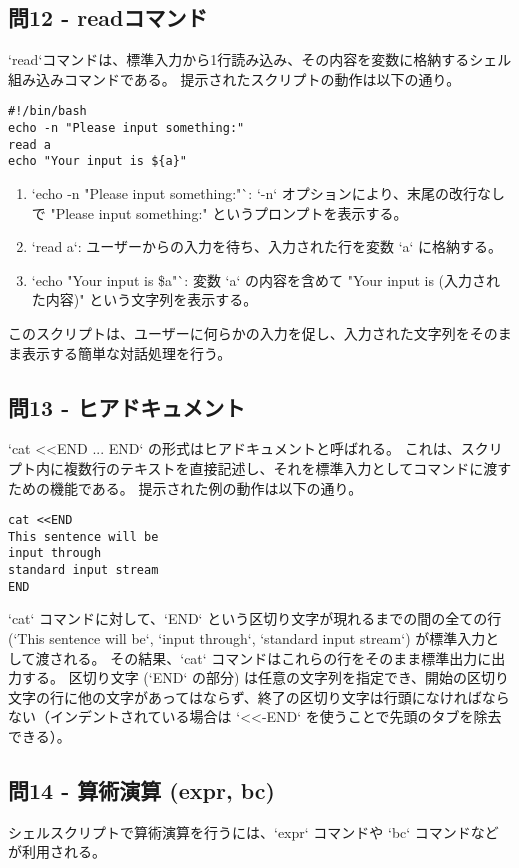 \documentclass[a4paper,11pt]{jsarticle}
\begin{document}
\subsection*{問12 - readコマンド}
`read`コマンドは、標準入力から1行読み込み、その内容を変数に格納するシェル組み込みコマンドである。
提示されたスクリプトの動作は以下の通り。
\begin{lstlisting}[caption=問12のスクリプト例]
#!/bin/bash
echo -n "Please input something:"
read a
echo "Your input is ${a}"
\end{lstlisting}
\begin{enumerate}
    \item `echo -n "Please input something:"`: `-n` オプションにより、末尾の改行なしで "Please input something:" というプロンプトを表示する。
    \item `read a`: ユーザーからの入力を待ち、入力された行を変数 `a` に格納する。
    \item `echo "Your input is \${a}"`: 変数 `a` の内容を含めて "Your input is (入力された内容)" という文字列を表示する。
\end{enumerate}
このスクリプトは、ユーザーに何らかの入力を促し、入力された文字列をそのまま表示する簡単な対話処理を行う。

\subsection*{問13 - ヒアドキュメント}
`cat <<END ... END` の形式はヒアドキュメントと呼ばれる。
これは、スクリプト内に複数行のテキストを直接記述し、それを標準入力としてコマンドに渡すための機能である。
提示された例の動作は以下の通り。
\begin{lstlisting}[caption=問13のスクリプト例]
cat <<END
This sentence will be
input through
standard input stream
END
\end{lstlisting}
`cat` コマンドに対して、`END` という区切り文字が現れるまでの間の全ての行 (`This sentence will be`, `input through`, `standard input stream`) が標準入力として渡される。
その結果、`cat` コマンドはこれらの行をそのまま標準出力に出力する。
区切り文字 (`END` の部分) は任意の文字列を指定でき、開始の区切り文字の行に他の文字があってはならず、終了の区切り文字は行頭になければならない（インデントされている場合は `<<-END` を使うことで先頭のタブを除去できる）。

\subsection*{問14 - 算術演算 (expr, bc)}
シェルスクリプトで算術演算を行うには、`expr` コマンドや `bc` コマンドなどが利用される。
\end{document}
